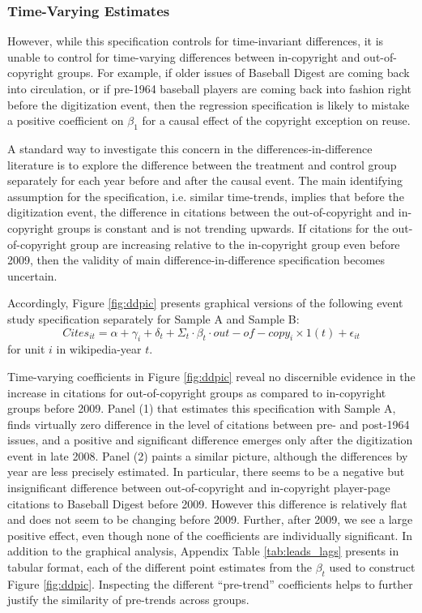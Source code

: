 \documentclass[11pt]{article}
\begin{document}
\subsubsection{Time-Varying Estimates}
\label{sec:timevary}

However, while this specification controls for time-invariant differences, it is unable to control for time-varying differences between in-copyright and out-of-copyright groups. For example, if older issues of Baseball Digest are coming back into circulation, or if pre-1964 baseball players are coming back into fashion right before the digitization event, then the regression specification is likely to mistake a positive coefficient on $\beta_1$ for a causal effect of the copyright exception on reuse.

A standard way to investigate this concern in the differences-in-difference literature \citep{bertrand_how_2004} is to explore the difference between the treatment and control group separately for each year before and after the causal event. The main identifying assumption for the specification, i.e. similar time-trends, implies that before the digitization event, the difference in citations between the out-of-copyright and in-copyright groups is constant and is not trending upwards. If citations for the out-of-copyright group are increasing relative to the in-copyright group even before 2009, then the validity of main difference-in-difference specification becomes uncertain.

Accordingly, Figure \ref{fig:ddpic} presents graphical versions of the following event study specification separately for Sample A and Sample B: $$Cites_{it} = \alpha + \gamma_i + \delta_t + \Sigma_t \cdot \beta_t \cdot out-of-copy_i \times 1(t) + \epsilon_{it} $$ for unit $i$ in wikipedia-year $t$.

Time-varying coefficients in Figure \ref{fig:ddpic} reveal no discernible evidence in the increase in citations for out-of-copyright groups as compared to in-copyright groups before 2009. Panel (1) that estimates this specification with Sample A, finds virtually zero difference in the level of citations between pre- and post-1964 issues, and a positive and significant difference emerges only after the digitization event in late 2008. Panel (2) paints a similar picture, although the differences by year are less precisely estimated. In particular, there seems to be a negative but insignificant difference between out-of-copyright and in-copyright player-page citations to Baseball Digest before 2009. However this difference is relatively flat and does not seem to be changing before 2009. Further, after 2009, we see a large positive effect, even though none of the coefficients are individually significant. In addition to the graphical analysis, Appendix Table \ref{tab:leads_lags} presents in tabular format, each of the different point estimates from the $\beta_t$ used to construct Figure \ref{fig:ddpic}. Inspecting the different ``pre-trend'' coefficients helps to further justify the similarity of pre-trends across groups. 
\end{document}
